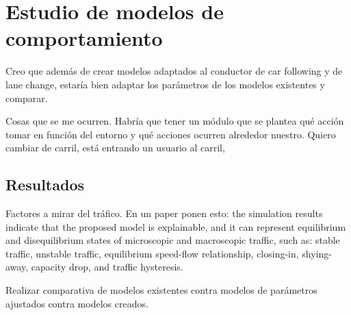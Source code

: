 \chapter{Estudio de modelos de comportamiento}
\label{ch:behavior-models-study}

Creo que además de crear modelos adaptados al conductor de car following y de lane change, estaría bien adaptar los parámetros de los modelos existentes y comparar.

Cosas que se me ocurren. Habría que tener un módulo que se plantea qué acción tomar en función del entorno y qué acciones ocurren alrededor nuestro. Quiero cambiar de carril, está entrando un usuario al carril, 


\section{Resultados}
\label{ch:behavior-models-study:results}

Factores a mirar del tráfico. En un paper ponen esto: the simulation  results indicate that the proposed model is explainable, and it can represent equilibrium and disequilibrium states of microscopic and macroscopic traffic, such as: stable traffic, unstable traffic, equilibrium speed-flow relationship, closing-in, shying-away, capacity drop, and traffic hysteresis.

Realizar comparativa de modelos existentes contra modelos de parámetros ajustados contra modelos creados.